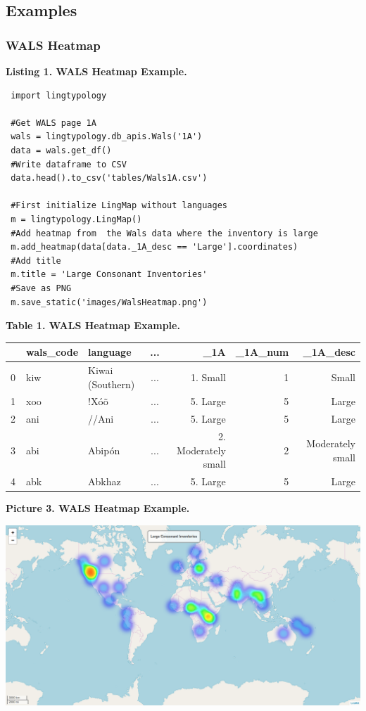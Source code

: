 \documentclass[a4paper,12pt]{article}
\begin{document}
\subsection{Examples}

\subsubsection{WALS Heatmap}

\textbf{Listing 1. WALS Heatmap Example.}
\begin{lstlisting}
 import lingtypology

 #Get WALS page 1A
 wals = lingtypology.db_apis.Wals('1A')
 data = wals.get_df()
 #Write dataframe to CSV
 data.head().to_csv('tables/Wals1A.csv')
 
 #First initialize LingMap without languages
 m = lingtypology.LingMap()
 #Add heatmap from  the Wals data where the inventory is large
 m.add_heatmap(data[data._1A_desc == 'Large'].coordinates)
 #Add title
 m.title = 'Large Consonant Inventories'
 #Save as PNG
 m.save_static('images/WalsHeatmap.png')
\end{lstlisting}

\textbf{Table 1. WALS Heatmap Example.}

\begin{adjustbox}{max width=\textwidth}
\begin{tabular}{ l | l | l | c | r | r | r }
    ~ & wals\_code & language & ... & \_1A & \_1A\_num & \_1A\_desc \\
    \hline
    0 & kiw &  Kiwai (Southern) & ... & 1. Small & 1 & Small \\
    1 & xoo & !Xóõ & ... & 5. Large & 5 & Large \\
    2 & ani & //Ani & ... & 5. Large & 5 & Large \\
    3 & abi & Abipón & ... & 2. Moderately small & 2 & Moderately small \\
    4 & abk & Abkhaz & ... & 5. Large & 5 & Large \\
\end{tabular}
\end{adjustbox}

\bigskip

\begin{samepage}
\textbf{Picture 3. WALS Heatmap Example.}\nopagebreak

\includegraphics[width=\textwidth]{images/WalsHeatMap.png}
\end{samepage}
\end{document}
